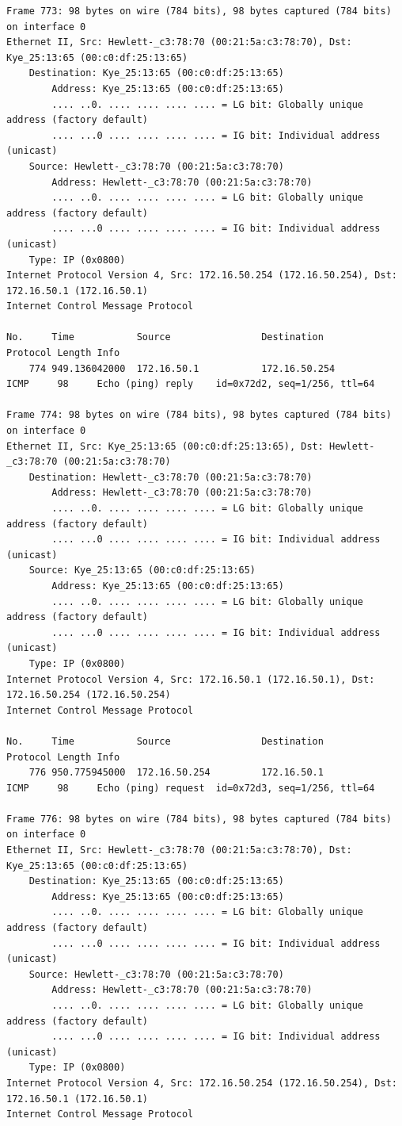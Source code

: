 \documentclass[a4paper,11pt]{article}
\begin{document}
\begin{lstlisting}
Frame 773: 98 bytes on wire (784 bits), 98 bytes captured (784 bits) on interface 0
Ethernet II, Src: Hewlett-_c3:78:70 (00:21:5a:c3:78:70), Dst: Kye_25:13:65 (00:c0:df:25:13:65)
    Destination: Kye_25:13:65 (00:c0:df:25:13:65)
        Address: Kye_25:13:65 (00:c0:df:25:13:65)
        .... ..0. .... .... .... .... = LG bit: Globally unique address (factory default)
        .... ...0 .... .... .... .... = IG bit: Individual address (unicast)
    Source: Hewlett-_c3:78:70 (00:21:5a:c3:78:70)
        Address: Hewlett-_c3:78:70 (00:21:5a:c3:78:70)
        .... ..0. .... .... .... .... = LG bit: Globally unique address (factory default)
        .... ...0 .... .... .... .... = IG bit: Individual address (unicast)
    Type: IP (0x0800)
Internet Protocol Version 4, Src: 172.16.50.254 (172.16.50.254), Dst: 172.16.50.1 (172.16.50.1)
Internet Control Message Protocol

No.     Time           Source                Destination           Protocol Length Info
    774 949.136042000  172.16.50.1           172.16.50.254         ICMP     98     Echo (ping) reply    id=0x72d2, seq=1/256, ttl=64

Frame 774: 98 bytes on wire (784 bits), 98 bytes captured (784 bits) on interface 0
Ethernet II, Src: Kye_25:13:65 (00:c0:df:25:13:65), Dst: Hewlett-_c3:78:70 (00:21:5a:c3:78:70)
    Destination: Hewlett-_c3:78:70 (00:21:5a:c3:78:70)
        Address: Hewlett-_c3:78:70 (00:21:5a:c3:78:70)
        .... ..0. .... .... .... .... = LG bit: Globally unique address (factory default)
        .... ...0 .... .... .... .... = IG bit: Individual address (unicast)
    Source: Kye_25:13:65 (00:c0:df:25:13:65)
        Address: Kye_25:13:65 (00:c0:df:25:13:65)
        .... ..0. .... .... .... .... = LG bit: Globally unique address (factory default)
        .... ...0 .... .... .... .... = IG bit: Individual address (unicast)
    Type: IP (0x0800)
Internet Protocol Version 4, Src: 172.16.50.1 (172.16.50.1), Dst: 172.16.50.254 (172.16.50.254)
Internet Control Message Protocol

No.     Time           Source                Destination           Protocol Length Info
    776 950.775945000  172.16.50.254         172.16.50.1           ICMP     98     Echo (ping) request  id=0x72d3, seq=1/256, ttl=64

Frame 776: 98 bytes on wire (784 bits), 98 bytes captured (784 bits) on interface 0
Ethernet II, Src: Hewlett-_c3:78:70 (00:21:5a:c3:78:70), Dst: Kye_25:13:65 (00:c0:df:25:13:65)
    Destination: Kye_25:13:65 (00:c0:df:25:13:65)
        Address: Kye_25:13:65 (00:c0:df:25:13:65)
        .... ..0. .... .... .... .... = LG bit: Globally unique address (factory default)
        .... ...0 .... .... .... .... = IG bit: Individual address (unicast)
    Source: Hewlett-_c3:78:70 (00:21:5a:c3:78:70)
        Address: Hewlett-_c3:78:70 (00:21:5a:c3:78:70)
        .... ..0. .... .... .... .... = LG bit: Globally unique address (factory default)
        .... ...0 .... .... .... .... = IG bit: Individual address (unicast)
    Type: IP (0x0800)
Internet Protocol Version 4, Src: 172.16.50.254 (172.16.50.254), Dst: 172.16.50.1 (172.16.50.1)
Internet Control Message Protocol


\end{lstlisting}
\end{document}
